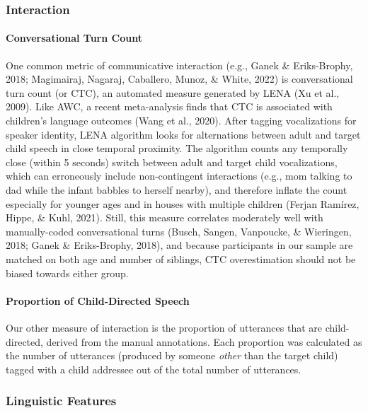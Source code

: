 \documentclass[
  man]{apa6}
\let\oldparagraph\paragraph
\renewcommand{\paragraph}[1]{\oldparagraph{#1}\mbox{}}
\begin{document}
\hypertarget{interaction}{%
\subsubsection{Interaction}\label{interaction}}

\hypertarget{conversational-turn-count}{%
\paragraph{Conversational Turn Count}\label{conversational-turn-count}}

One common metric of communicative interaction (e.g., Ganek \& Eriks-Brophy, 2018; Magimairaj, Nagaraj, Caballero, Munoz, \& White, 2022) is conversational turn count (or CTC), an automated measure generated by LENA (Xu et al., 2009). Like AWC, a recent meta-analysis finds that CTC is associated with children's language outcomes (Wang et al., 2020). After tagging vocalizations for speaker identity, LENA algorithm looks for alternations between adult and target child speech in close temporal proximity. The algorithm counts any temporally close (within 5 seconds) switch between adult and target child vocalizations, which can erroneously include non-contingent interactions (e.g., mom talking to dad while the infant babbles to herself nearby), and therefore inflate the count especially for younger ages and in houses with multiple children (Ferjan Ramírez, Hippe, \& Kuhl, 2021). Still, this measure correlates moderately well with manually-coded conversational turns (Busch, Sangen, Vanpoucke, \& Wieringen, 2018; Ganek \& Eriks-Brophy, 2018), and because participants in our sample are matched on both age and number of siblings, CTC overestimation should not be biased towards either group.

\hypertarget{proportion-of-child-directed-speech}{%
\paragraph{Proportion of Child-Directed Speech}\label{proportion-of-child-directed-speech}}

Our other measure of interaction is the proportion of utterances that are child-directed, derived from the manual annotations. Each proportion was calculated as the number of utterances (produced by someone \emph{other} than the target child) tagged with a child addressee out of the total number of utterances.

\hypertarget{linguistic-features}{%
\subsubsection{Linguistic Features}\label{linguistic-features}}
\end{document}

